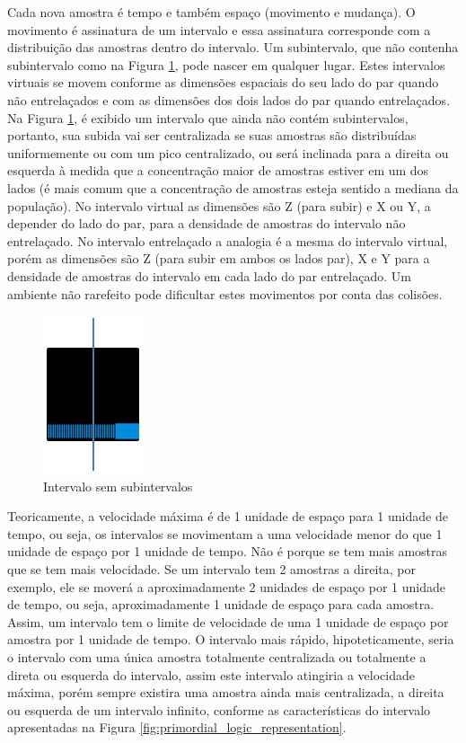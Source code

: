 Cada nova amostra é tempo e também espaço (movimento e mudança). O movimento é assinatura de um intervalo e essa assinatura corresponde com a distribuição das amostras dentro do intervalo. Um subintervalo, que não contenha subintervalo como na Figura \ref{fig:consciousness_space_plan_nosubinterval}, pode nascer em qualquer lugar. Estes intervalos virtuais se movem conforme as dimensões espaciais do seu lado do par quando não entrelaçados e com as dimensões dos dois lados do par quando entrelaçados. Na Figura \ref{fig:consciousness_space_plan_nosubinterval}, é exibido um intervalo que ainda não contém subintervalos, portanto, sua subida vai ser centralizada se suas amostras são distribuídas uniformemente ou com um pico centralizado, ou será inclinada para a direita ou esquerda à medida que a concentração maior de amostras estiver em um dos lados (é mais comum que a concentração de amostras esteja sentido a mediana da população). No intervalo virtual as dimensões são Z (para subir) e X ou Y, a depender do lado do par, para a densidade de amostras do intervalo não entrelaçado. No intervalo entrelaçado a analogia é a mesma do intervalo virtual, porém as dimensões são Z (para subir em ambos os lados par), X e Y para a densidade de amostras do intervalo em cada lado do par entrelaçado. Um ambiente não rarefeito pode dificultar estes movimentos por conta das colisões. 
	\begin{figure}[H]
	\caption{Intervalo sem subintervalos}
	\label{fig:consciousness_space_plan_nosubinterval}
	\centering
	\includegraphics[scale=.7]{sections/images/consciousness_space_plan_nosubinterval.jpg}
	\end{figure}

Teoricamente, a velocidade máxima é de 1 unidade de espaço para 1 unidade de tempo, ou seja, os intervalos se movimentam a uma velocidade menor do que 1 unidade de espaço por 1 unidade de tempo. Não é porque se tem mais amostras que se tem mais velocidade. Se um intervalo tem 2 amostras a direita, por exemplo, ele se moverá a aproximadamente 2 unidades de espaço por 1 unidade de tempo, ou seja, aproximadamente 1 unidade de espaço para cada amostra. Assim, um intervalo tem o limite de velocidade de uma 1 unidade de espaço por amostra por 1 unidade de tempo. O intervalo mais rápido, hipoteticamente, seria o intervalo com uma única amostra totalmente centralizada ou totalmente a direta ou esquerda do intervalo, assim este intervalo atingiria a velocidade máxima, porém sempre existira uma amostra ainda mais centralizada, a direita ou esquerda de um intervalo infinito, conforme as características do intervalo apresentadas na Figura \ref{fig:primordial_logic_representation}. 

